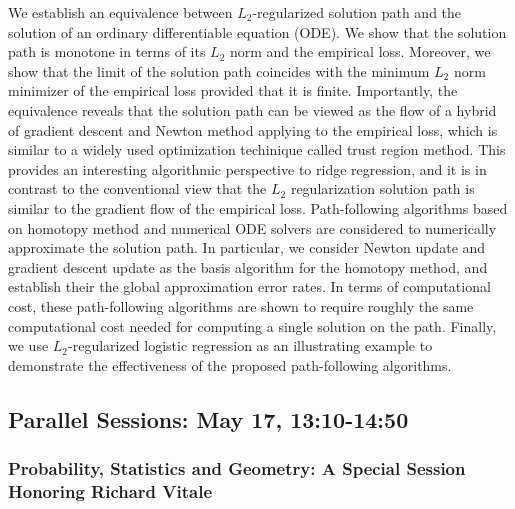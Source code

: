 \begin{itemize}
We establish an equivalence between $L_2$-regularized solution path and the solution of an ordinary differentiable equation (ODE). We show that the solution path is monotone in terms of its $L_2$ norm and the empirical loss. Moreover, we show that the limit of the solution path coincides with the minimum $L_2$ norm minimizer of the empirical loss provided that it is finite. Importantly, the equivalence reveals that the solution path can be viewed as the flow of a hybrid of gradient descent and Newton method applying to the empirical loss, which is similar to a widely used optimization techinique called trust region method. This provides an interesting algorithmic perspective to ridge regression, and it is in contrast to the conventional view that the $L_2$ regularization solution path is similar to the gradient flow of the empirical loss. Path-following algorithms based on homotopy method and numerical ODE solvers are considered to numerically approximate the solution path. In particular, we consider Newton update and gradient descent update as the basis algorithm for the homotopy method, and establish their the global approximation error rates. In terms of computational cost, these path-following algorithms are shown to require roughly the same computational cost needed for computing a single solution on the path. Finally, we use $L_2$-regularized logistic regression as an illustrating example to demonstrate the effectiveness of the proposed path-following algorithms.

\end{itemize}

\subsection*{Parallel Sessions: May 17, 13:10-14:50}

\subsubsection*{Probability, Statistics and Geometry: A Special Session Honoring Richard Vitale}

